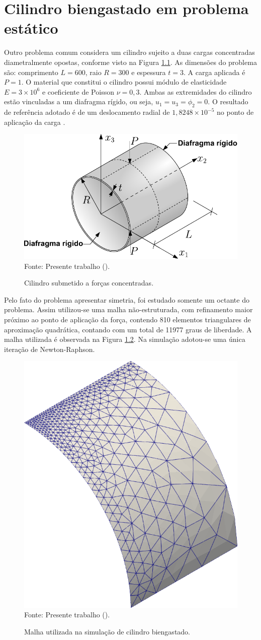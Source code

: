 \chapter[APÊNDICE \ref{Ap:Shell-cyl}]{Cilindro biengastado em problema estático}
\label{Ap:Shell-cyl}

Outro problema comum considera um cilindro sujeito a duas cargas concentradas diametralmente opostas, conforme visto na Figura \ref{fig:cylinder-shell}. As dimensões do problema são: comprimento $L=600$, raio $R=300$ e espessura $t=3$. A carga aplicada é $P=1$. O material que constitui o cilindro possui módulo de elasticidade $E=3\times10^6$ e coeficiente de Poisson $\nu=0,3$. Ambas as extremidades do cilindro estão vinculadas a um diafragma rígido, ou seja, $u_1=u_3=\phi_2=0$. O resultado de referência adotado é de um deslocamento radial de $1,8248\times10^{-5}$ no ponto de aplicação da carga \cite{BELYTSCHKO1985221,CHAUDINH2023110222,ZHOU2022108568}.

\begin{figure}[h!]
    \centering
    \caption{Cilindro submetido a forças concentradas.}
    \includegraphics[width=0.65\linewidth]{Figuras/cylinder-shell/cylinder.pdf}
    \\Fonte: Presente trabalho (\the\year).
    \label{fig:cylinder-shell}
\end{figure}

Pelo fato do problema apresentar simetria, foi estudado somente um octante do problema. Assim utilizou-se uma malha não-estruturada, com refinamento maior próximo ao ponto de aplicação da força, contendo 810 elementos triangulares de aproximação quadrática, contando com um total de 11977 graus de liberdade. A malha utilizada é observada na Figura \ref{fig:cylinder-shell-mesh}. Na simulação adotou-se uma única iteração de Newton-Raphson.

\begin{figure}[h!]
    \centering
    \caption{Malha utilizada na simulação de cilindro biengastado.}
    \includegraphics[width=0.3\linewidth]{Figuras/cylinder-shell/mesh1.png}
    \\Fonte: Presente trabalho (\the\year).
    \label{fig:cylinder-shell-mesh}
\end{figure}

